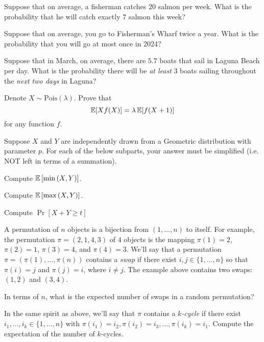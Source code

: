 \documentclass[11pt]{article}
\begin{document}
\begin{Parts}
	\Part Suppose that on average, a fisherman catches $20$ salmon per week. What is the probability that he will catch exactly $7$ salmon this week?
    
	
	\Part Suppose that on average, you go to Fisherman's Wharf twice a year. What is the probability that you will go at most once in 2024?
    

	\Part Suppose that in March, on average, there are $5.7$ boats that sail in Laguna Beach per day. What is the probability there will be \textit{at least} $3$ boats sailing throughout the \textit{next two days} in Laguna?
    

    \Part Denote $X \sim \text{Pois}(\lambda)$. Prove that \[ \operatorname{\mathbb{E}}[Xf(X)] = \lambda \operatorname{\mathbb{E}}[f(X+1)] \] for any function $f$. 
    

	
\end{Parts}

Suppose $X$ and $Y$ are independently drawn from a Geometric distribution with parameter $p$. For each of the below subparts, your answer must be simplified (i.e. NOT left in terms of a summation).

\begin{Parts}
    \Part Compute $\operatorname{\mathbb{E}}\left[\min\left(X,Y\right)\right]$.

    

    \Part Compute $\operatorname{\mathbb{E}}\left[\max\left(X,Y\right)\right]$.

    

    \Part Compute $\Pr[X + Y \ge t]$

    

\end{Parts}

A permutation of $n$ objects is a bijection from $(1,\ldots,n)$ to itself.  For example, the permutation $\pi=(2,1,4,3)$ of $4$ objects is the mapping $\pi(1) = 2$, $\pi(2) = 1$, $\pi(3) = 4$, and $\pi(4) = 3$.
We'll say that a permutation $\pi = (\pi(1),\ldots,\pi(n))$ contains a \emph{swap} if there exist $i,j\in\{1,\ldots,n\}$ so that $\pi(i) = j$ and $\pi(j) = i$, where $i \neq j$. The example above contains two swaps: $(1,2)$ and $(3,4)$.
\begin{Parts}
	\Part In terms of $n$, what is the expected number of swaps in a random permutation?
	
	\Part In the same spirit as above, we'll say that $\pi$ contains a \emph{$k$-cycle} if there exist $i_1,\ldots,i_k \in \{1,\ldots,n\}$ with $\pi(i_1) = i_2,\pi(i_2) = i_3,\ldots,\pi(i_k) = i_1$. Compute the expectation of the number of $k$-cycles. 
	
\end{Parts}
\end{document}
